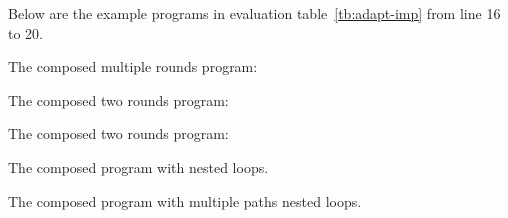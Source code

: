Below are the example programs in evaluation table~\ref{tb:adapt-imp} from line 16 to 20.
\begin{example}[$\kw{mRCompose}$]
The composed multiple rounds program:
\\

\end{example}
\begin{example}[$\kw{tRCompose}$]
The composed two rounds program:
\\

\end{example}
\begin{example}[$\kw{seqCompose}$]
    The composed two rounds program:
    \\
    
\end{example}
\begin{example}[$\kw{jumboS}$]
    The composed program with nested loops. 
    \\
    
\end{example}
\begin{example}[$\kw{jumbo}$]
    The composed program with multiple paths nested loops. 
    \\
    
\end{example}